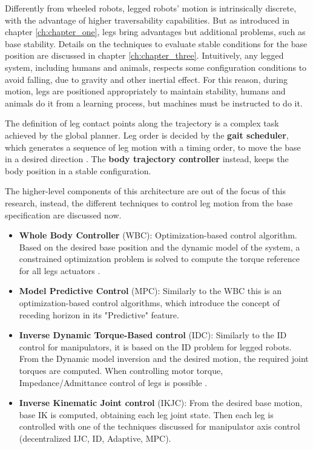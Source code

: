 Differently from wheeled robots, legged robots' motion is intrinsically discrete, with the advantage of higher traversability capabilities. 
But as introduced in chapter \ref{ch:chapter_one}, legs bring advantages but additional problems, such as base stability. Details on the techniques to evaluate stable conditions for the base position are discussed in chapter \ref{ch:chapter_three}. Intuitively, any legged system, including humans and animals, respects some configuration conditions to avoid falling, due to gravity and other inertial effect. For this reason, during motion, legs are positioned appropriately to maintain stability, humans and animals do it from a learning process, but machines must be instructed to do it. 

The definition of leg contact points along the trajectory is a complex task achieved by the global planner\cite{LIMBEROTakadaThesis}.
Leg order is decided by the \textbf{gait scheduler}, which generates a sequence of leg motion with a timing order, to move the base in a desired direction \cite{Todd}\cite{HiroseDesignGate}\cite{Raibert}. The \textbf{body trajectory controller} instead, keeps the body position in a stable configuration. 

The higher-level components of this architecture are out of the focus of this research, instead, the different techniques to control leg motion from the base specification are discussed now. 

\begin{itemize}
    \setlength\itemsep{-0.7em} 
    \item \textbf{Whole Body Controller} (WBC): Optimization-based control algorithm. Based on the desired base position and the dynamic model of the system, a constrained optimization problem is solved to compute the torque reference for all legs actuators \cite{AnymalDocThesis}\cite{WBCFocchi}\cite{WBCQuadruped}.
    \item \textbf{Model Predictive Control} (MPC): Similarly to the WBC this is an optimization-based control algorithms, which introduce the concept of receding horizon in its "Predictive" feature.  
    \item \textbf{Inverse Dynamic Torque-Based control} (IDC): Similarly to the ID control for manipulators, it is based on the ID problem for legged robots. From the Dynamic model inversion and the desired motion, the required joint torques are computed. When controlling motor torque, Impedance/Admittance control of legs is possible \cite{Siciliano}.
    \item \textbf{Inverse Kinematic Joint control} (IKJC): From the desired base motion, base IK is computed, obtaining each leg joint state. Then each leg is controlled with one of the techniques discussed for manipulator axis control (decentralized IJC, ID, Adaptive, MPC).
\end{itemize}

